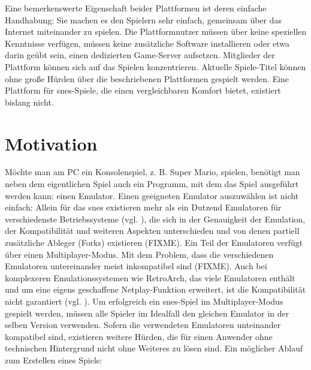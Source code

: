 Eine bemerkenswerte Eigenschaft beider Plattformen ist deren einfache
Handhabung: Sie machen es den Spielern sehr einfach, gemeinsam über das
Internet miteinander zu spielen. Die Plattformnutzer müssen über keine
speziellen Kenntnisse verfügen, müssen keine zusätzliche Software
installieren oder etwa darin geübt sein, einen dedizierten Game-Server
aufsetzen. Mitglieder der Plattform können sich auf das Spielen
konzentrieren. Aktuelle Spiele-Titel können ohne große Hürden über die
beschriebenen Plattformen gespielt werden. Eine Plattform für
\gls{snes}-Spiele, die einen vergleichbaren Komfort bietet, existiert
bislang nicht.

\section{Motivation}\label{motivation}

Möchte man am PC ein Konsolenspiel, z. B. Super Mario, spielen, benötigt
man neben dem eigentlichen Spiel auch ein Programm, mit dem das Spiel
ausgeführt werden kann: einen Emulator. Einen geeigneten Emulator
auszuwählen ist nicht einfach: Allein für das \gls{snes} existieren mehr
als ein Dutzend Emulatoren für verschiedenste Betriebssysteme (vgl.
\cite{snes-emulator-list}), die sich in der Genauigkeit der Emulation,
der Kompatibilität und weiteren Aspekten unterschieden und von denen
partiell zusätzliche Ableger (Forks) existieren (FIXME). Ein Teil der
Emulatoren verfügt über einen Multiplayer-Modus. Mit dem Problem, dass
die verschiedenen Emulatoren untereinander meist inkompatibel sind
(FIXME). Auch bei komplexeren Emulationssystemen wie RetroArch, das
viele Emulatoren enthält und um eine eigens geschaffene Netplay-Funktion
erweitert, ist die Kompatibilität nicht garantiert (vgl.
\cite{retroarch-netplay-comp}). Um erfolgreich ein \gls{snes}-Spiel im
Multiplayer-Modus gespielt werden, müssen alle Spieler im Idealfall den
gleichen Emulator in der selben Version verwenden. Sofern die
verwendeten Emulatoren unteinander kompatibel sind, existieren weitere
Hürden, die für einen Anwender ohne technischen Hintergrund nicht ohne
Weiteres zu lösen sind. Ein möglicher Ablauf zum Erstellen eines Spiels:

